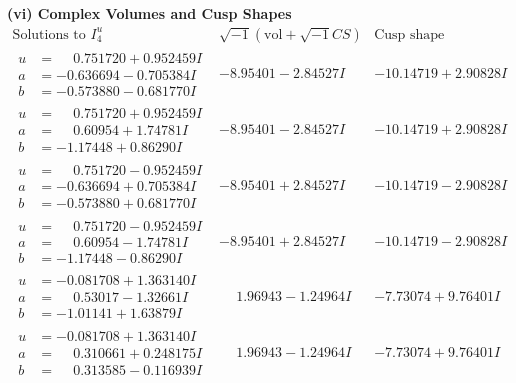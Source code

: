 \documentclass[1p]{elsarticle_modified}
\theoremstyle{definition}
\newcommand{\I}{\sqrt{-1}}
\begin{document}
\newpage\flushleft \textbf{(vi) Complex Volumes and Cusp Shapes}
$$\begin{array}{c|c|c}  
\text{Solutions to }I^u_{4}& \I (\text{vol} + \sqrt{-1}CS) & \text{Cusp shape}\\
 \hline 
\begin{aligned}
u &= \phantom{-}0.751720 + 0.952459 I \\
a &= -0.636694 - 0.705384 I \\
b &= -0.573880 - 0.681770 I\end{aligned}
 & -8.95401 - 2.84527 I & -10.14719 + 2.90828 I \\ \hline\begin{aligned}
u &= \phantom{-}0.751720 + 0.952459 I \\
a &= \phantom{-}0.60954 + 1.74781 I \\
b &= -1.17448 + 0.86290 I\end{aligned}
 & -8.95401 - 2.84527 I & -10.14719 + 2.90828 I \\ \hline\begin{aligned}
u &= \phantom{-}0.751720 - 0.952459 I \\
a &= -0.636694 + 0.705384 I \\
b &= -0.573880 + 0.681770 I\end{aligned}
 & -8.95401 + 2.84527 I & -10.14719 - 2.90828 I \\ \hline\begin{aligned}
u &= \phantom{-}0.751720 - 0.952459 I \\
a &= \phantom{-}0.60954 - 1.74781 I \\
b &= -1.17448 - 0.86290 I\end{aligned}
 & -8.95401 + 2.84527 I & -10.14719 - 2.90828 I \\ \hline\begin{aligned}
u &= -0.081708 + 1.363140 I \\
a &= \phantom{-}0.53017 - 1.32661 I \\
b &= -1.01141 + 1.63879 I\end{aligned}
 & \phantom{-}1.96943 - 1.24964 I & -7.73074 + 9.76401 I \\ \hline\begin{aligned}
u &= -0.081708 + 1.363140 I \\
a &= \phantom{-}0.310661 + 0.248175 I \\
b &= \phantom{-}0.313585 - 0.116939 I\end{aligned}
 & \phantom{-}1.96943 - 1.24964 I & -7.73074 + 9.76401 I \\ \hline\begin{aligned}

\end{aligned}
\end{array}$$
\end{document}
